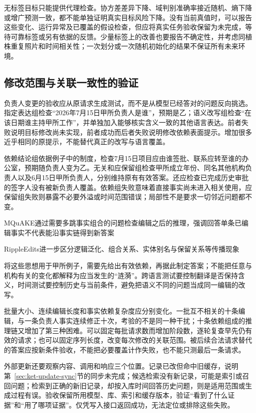 无标签目标只能提供代理检查。协方差差异下降、域判别准确率接近随机、熵下降或增广预测一致，都不能单独证明真实目标风险下降。没有当前真值时，可以报告这些变化、运行异常及已覆盖的假设检查，但应将真实任务验收保留为未完成，等待可靠标签或另有依据的反馈。少量标签上的改善也要报告不确定性，并考虑同植株重复照片和时间相关性；一次划分或一次随机初始化的结果不保证所有未来环境。

\subsection{修改范围与关联一致性的验证}
\label{sec:ket-update-edit-validation}

负责人变更的验收应从原请求生成测试，而不是从模型已经答对的问题反向挑选。指定表达组检查“2026年7月15日甲所负责人是谁”，预期是乙；语义改写组检查“在该日期谁主持甲所工作”，并单独加入能够核实含义一致的其他语言表达。前者失败说明目标修改尚未实现，前者成功而后者失败说明修改依赖表面提示。增加很多近乎相同的原提示，不能替代真正的改写与语言覆盖。

依赖结论组依据例子中的制度，检查7月15日项目应由谁签批、联系应转至谁的办公室，预期随负责人变为乙。无关和应保留组检查甲所成立年份、同名其他机构负责人以及6月15日甲所负责人，分别维持原有有效答案。还应检查已完成历史审批的签字人没有被新负责人覆盖。依赖组失败意味着直接事实尚未进入相关使用，应保留组失败则暴露不必要外溢或时间范围错误；局部性不是要求一切邻近问题都不变。

MQuAKE通过需要多跳事实组合的问题检查编辑之后的推理，强调回答单条已编辑事实不代表能沿事实链得到新答案

RippleEdits进一步区分逻辑泛化、组合关系、实体别名与保留关系等传播现象

将这些思想用于甲所例子，需要先给出有效依赖，再据此制定答案；不能把任意与机构有关的变化都解释为应当发生的“涟漪”。跨语言测试要控制翻译是否保持含义，时间测试要控制历史与当前条件，避免把语义不同的问题当成同一编辑的改写。

批量大小、连续编辑长度和事实依赖复杂度应分别变化。一批互不相关的十条编辑，与一条负责人事实连续修正十次，考验的不是同一种干扰；十条依赖组成的推理链又增加了第三种困难。可以固定每批请求数而增加阶段数，逐轮复查早先仍有效的请求；也可以固定序列长度，改变每次修改的关联范围。被后续合法请求替代的答案应按新条件验收，不能把必要覆盖计作失败，也不能只测最后一条请求。

外部更新还要观察内容、调用和响应三个位置。记录已改但命中旧缓存，说明第~\ref{sec:ket-update-sync}节的同步未完成；候选检索没有新记录，可能是索引或召回问题；检索到正确的新旧记录，却按入库时间回答历史问题，则是适用范围或生成过程有误。验收保留所用模型、库、索引和缓存版本，验证“看到了什么证据”和“用了哪项证据”。仅凭写入接口返回成功，无法定位或排除这些失败。

